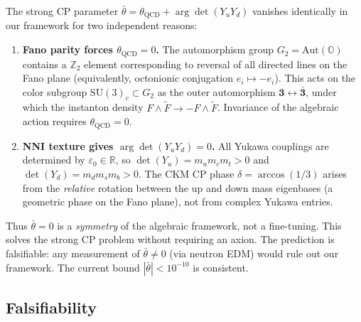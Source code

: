 \documentclass[12pt,a4paper]{article}
\theoremstyle{definition}
\theoremstyle{remark}
\newcommand{\Oct}{\mathbb{O}}
\newcommand{\SU}{\mathrm{SU}}
\begin{document}
The strong CP parameter $\bar\theta = \theta_{\text{QCD}} + 
\arg\det(Y_u Y_d)$ vanishes identically in our framework for two 
independent reasons:
\begin{enumerate}
\item \textbf{Fano parity forces $\theta_{\text{QCD}} = 0$.}
The automorphism group $G_2 = \mathrm{Aut}(\Oct)$ contains a $\mathbb{Z}_2$ 
element corresponding to reversal of all directed lines on the Fano plane 
(equivalently, octonionic conjugation $e_i \mapsto -e_i$). This acts on the 
color subgroup $\SU(3)_c \subset G_2$ as the outer automorphism $\mathbf{3} 
\leftrightarrow \bar{\mathbf{3}}$, under which the instanton density 
$F \wedge \tilde{F} \to -F \wedge \tilde{F}$. Invariance of the algebraic 
action requires $\theta_{\text{QCD}} = 0$.

\item \textbf{NNI texture gives $\arg\det(Y_u Y_d) = 0$.}
All Yukawa couplings are determined by $\varepsilon_0 \in \mathbb{R}$, so 
$\det(Y_u) = m_u m_c m_t > 0$ and $\det(Y_d) = m_d m_s m_b > 0$. The 
CKM CP phase $\delta = \arccos(1/3)$ arises from the \emph{relative} 
rotation between the up and down mass eigenbases (a geometric phase on the 
Fano plane), not from complex Yukawa entries.
\end{enumerate}
Thus $\bar\theta = 0$ is a \emph{symmetry} of the algebraic framework, not 
a fine-tuning. This solves the strong CP problem without requiring an 
axion. The prediction is falsifiable: any measurement of 
$\bar\theta \neq 0$ (via neutron EDM) would rule out our framework. The 
current bound $|\bar\theta| < 10^{-10}$ is consistent.

\subsection{Falsifiability}
\end{document}
